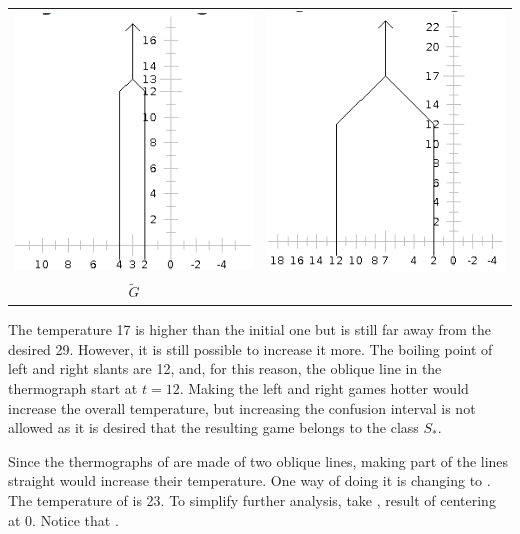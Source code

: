 \begin{center}
\begin{tabular}{cc}
\includegraphics[scale=0.5]{../images/gtherm.png} & \includegraphics[scale=0.5]{../images/gplus.png} \\
$\tilde{G}$ & \Gm{_+} \\
\end{tabular}
\end{center}

The temperature 17 is higher than the initial one but is still far away from the desired 29. However, it is still possible to increase it more. The boiling point of left and right slants are 12, and, for this reason, the oblique line in the thermograph start at $t=12$. Making the left and right games hotter would increase the overall temperature, but increasing the confusion interval is not allowed as it is desired that the resulting game belongs to the class $S_*$.

Since the thermographs of  are made of two oblique lines, making part of the lines straight would increase their temperature. One way of doing it is changing  to . The temperature of
 is 23. To simplify further analysis, take , result of centering \Gm{_-} at 0. Notice that .

